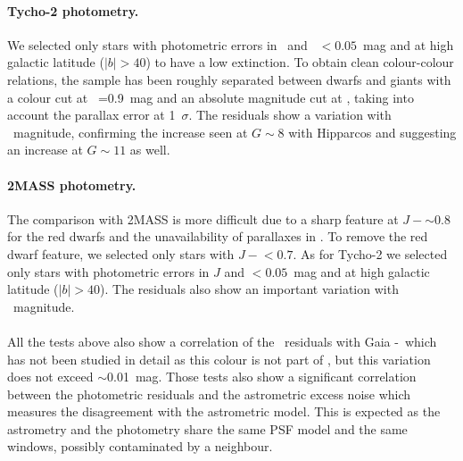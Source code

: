\paragraph{Tycho-2 photometry.} We selected only stars with photometric errors in \bt~and \vt~$<0.05$~mag and at high galactic latitude ($\vert b \vert>40$\deg) to have a low extinction. To obtain clean colour-colour relations, 
the sample has been roughly separated between dwarfs and giants with a colour cut at \btmvt~=0.9~mag and an absolute magnitude cut at , taking into account the parallax error at 1~$\sigma$. The residuals show a variation with \gmag~magnitude, confirming the increase seen at $G\sim 8$ with Hipparcos and suggesting an increase at $G\sim 11$ as well. 


\paragraph{2MASS photometry.} The comparison with 2MASS is more difficult due to a sharp feature at $J-$\Ks$\sim 0.8$ for the red dwarfs and the unavailability of parallaxes in {}. To remove the red dwarf feature, we selected only stars with $J-$\Ks$<0.7$. As for Tycho-2 we selected only stars with photometric errors in $J$ and \Ks$<0.05$~mag and at high galactic latitude ($\vert b \vert>40$\deg). The residuals also show an important variation with \gmag~magnitude. 

\paragraph{} All the tests above also show a correlation of the \gmag~residuals with Gaia \gbp-\grp~which has not been studied in detail as this colour is not part of {}, but this variation does not exceed $\sim$0.01~mag.
Those tests also show a significant correlation between the photometric residuals and the astrometric excess noise which measures the disagreement with the astrometric model. This is expected as the astrometry and the photometry share the same PSF model
and the same windows, possibly contaminated by a neighbour.


